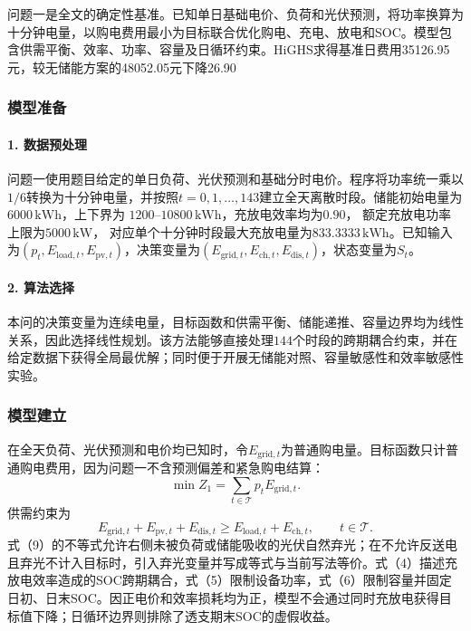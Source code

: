 \documentclass{cumcmthesis}
\newcommand{\Tset}{\mathcal{T}}
\begin{document}
问题一是全文的确定性基准。已知单日基础电价、负荷和光伏预测，将功率换算为十分钟电量，以购电费用最小为目标联合优化购电、充电、放电和SOC。模型包含供需平衡、效率、功率、容量及日循环约束。HiGHS求得基准日费用35126.95元，较无储能方案的48052.05元下降26.90%

\subsubsection{模型准备}

\paragraph{1. 数据预处理}

问题一使用题目给定的单日负荷、光伏预测和基础分时电价。程序将功率统一乘以$1/6$转换为十分钟电量，并按照$t=0,1,\ldots,143$建立全天离散时段。储能初始电量为$6000\,\mathrm{kWh}$，上下界为
$1200$--$10800\,\mathrm{kWh}$，充放电效率均为$0.90$，
额定充放电功率上限为$5000\,\mathrm{kW}$，
对应单个十分钟时段最大充放电量为$833.3333\,\mathrm{kWh}$。已知输入为$(p_t,E_{\mathrm{load},t},E_{\mathrm{pv},t})$，决策变量为$(E_{\mathrm{grid},t},E_{\mathrm{ch},t},E_{\mathrm{dis},t})$，状态变量为$S_t$。

\paragraph{2. 算法选择}

本问的决策变量为连续电量，目标函数和供需平衡、储能递推、容量边界均为线性关系，因此选择线性规划。该方法能够直接处理$144$个时段的跨期耦合约束，并在给定数据下获得全局最优解；同时便于开展无储能对照、容量敏感性和效率敏感性实验。

\subsubsection{模型建立}

在全天负荷、光伏预测和电价均已知时，令$E_{\mathrm{grid},t}$为普通购电量。目标函数只计普通购电费用，因为问题一不含预测偏差和紧急购电结算：
\begin{equation}
\min Z_1=\sum_{t\in\Tset}p_tE_{\mathrm{grid},t}.
\tag{8}
\end{equation}
供需约束为
\begin{equation}
E_{\mathrm{grid},t}+E_{\mathrm{pv},t}+E_{\mathrm{dis},t}
\geq E_{\mathrm{load},t}+E_{\mathrm{ch},t},\qquad t\in\Tset.
\tag{9}
\end{equation}
式（9）的不等式允许右侧未被负荷或储能吸收的光伏自然弃光；在不允许反送电且弃光不计入目标时，引入弃光变量并写成等式与当前写法等价。式（4）描述充放电效率造成的SOC跨期耦合，式（5）限制设备功率，式（6）限制容量并固定日初、日末SOC。因正电价和效率损耗均为正，模型不会通过同时充放电获得目标值下降；日循环边界则排除了透支期末SOC的虚假收益。
\end{document}
